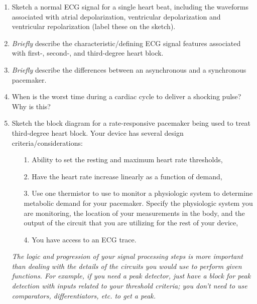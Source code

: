 \documentclass[12pt]{article}
\begin{document}
\begin{enumerate}
\item Sketch a normal ECG signal for a single heart beat, including the waveforms
associated with atrial depolarization, ventricular depolarization and
ventricular repolarization (label these on the sketch).

\item \emph{Briefly} describe the characteristic/defining ECG signal features
associated with first-, second-, and third-degree heart block.

\item \emph{Briefly} describe the differences between an asynchronous and a synchronous pacemaker.

\item When is the worst time during a cardiac cycle to deliver a shocking pulse?  Why is this?

\item Sketch the block diagram for a rate-responsive pacemaker being used to
treat third-degree heart block.  Your device has several design
criteria/considerations:
\begin{enumerate}
    \item[1.] Ability to set the resting and maximum heart rate thresholds,
    \item[2.] Have the heart rate increase linearly as a function of demand,
    \item[3.] Use one thermistor to use to monitor a physiologic system to
determine metabolic demand for your pacemaker.  Specify the physiologic system
you are monitoring, the location of your measurements in the body, and the
output of the circuit that you are utilizing for the rest of your device,
    \item[4.] You have access to an ECG trace.
\end{enumerate}
\emph{The logic and progression of your signal processing steps is more
important than dealing with the details of the circuits you would use to
perform given functions.  For example, if you need a peak detector, just have a
block for peak detection with inputs related to your threshold criteria; you
don't need to use comparators, differentiators, etc. to get a peak.}
\end{enumerate}

\clearpage



\clearpage



\clearpage
\end{document}
